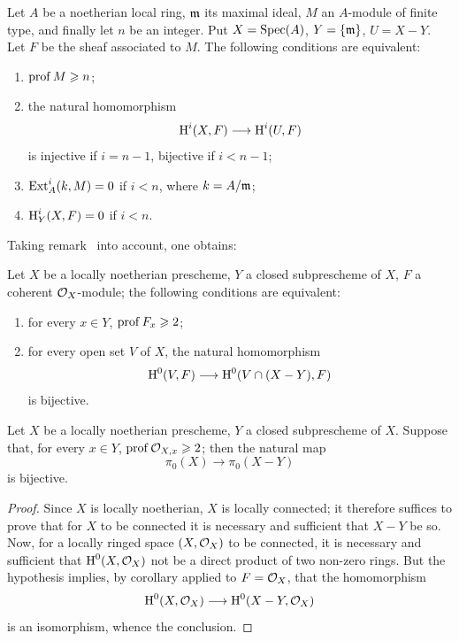 \bgroup
{}
\begin{example} \label{III.3.4}
Let $A$ be a noetherian local ring, $\mathfrak{m}$ its maximal ideal, $M$ an $A$-module of finite type, and finally let $n$ be an integer. Put $X=\operatorname{Spec} (A)$, $Y=\{\mathfrak{m}\}$, $U=X-Y$. Let $F$ be the sheaf associated to $M$. The following conditions are equivalent:
\begin{enumerate}

\item
$\operatorname{prof} M \geqslant n$;

\item
the natural homomorphism
\[
\H^i(X, F) \to \H^i(U, F)
\]
is injective if $i=n-1$, bijective if $i<n-1$;

\item
$\operatorname{Ext}_A^i(k, M) =0$ if $i<n$, where $k=A/\mathfrak{m}$;

\item
$\operatorname{H}_Y^i(X, F)=0$ if $i<n$.
\end{enumerate}
\end{example}

Taking remark~ into account, one obtains:

\begin{corollary} \label{III.3.5}
Let $X$ be a locally noetherian prescheme, $Y$ a closed subprescheme of $X$, $F$ a coherent $\mathcal{O}_X$-module; the following conditions are equivalent:
\begin{enumerate}
\item
for every $x\in Y$, $\operatorname{prof} F_x \geqslant 2$;
\item
for every open set $V$ of $X$, the natural homomorphism
\[
\H^0(V, F) \to \H^0(V\cap(X-Y), F)
\]
is bijective.
\end{enumerate}
\end{corollary}
\egroup

\begin{theorem}[Hartshorne] \label{III.3.6}
Let $X$ be a locally noetherian prescheme, $Y$ a closed subprescheme of $X$. Suppose that, for every $x\in Y$, $\operatorname{prof} {\mathcal O}_{X, x} \geqslant 2$; then the natural map
\[
\pi_0(X) \to \pi_0(X-Y)
\]
is bijective.
\end{theorem}

\begin{proof}
Since $X$ is locally noetherian, $X$ is locally connected; it therefore suffices to prove that for $X$ to be connected it is necessary and sufficient that $X-Y$ be so. Now, for a locally ringed space $(X, \mathcal{O}_X)$ to be connected, it is necessary and sufficient that $\operatorname{H}^0(X, \mathcal{O}_X)$ not be a direct product of two non-zero rings. But the hypothesis implies, by corollary  applied to $F=\mathcal{O}_X$, that the homomorphism
\[
\H^0(X, \OX) \to \H^0(X-Y, \OX)
\]
is an isomorphism, whence the conclusion.
\skipqed
\end{proof}

